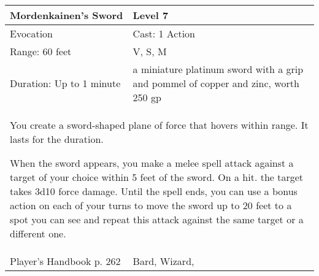 \documentclass[11pt]{report}
\begin{document}
\begin{table}[H]
	\begin{tabular}{||p{6cm}|p{6cm}||}
		\hline\hline
		\bf{Mordenkainen’s Sword} & Level 7\\ \hline
		Evocation & Cast: 1 Action\\ \hline
		Range: 60 feet & V, S, M\\ \hline
		Duration: Up to 1 minute & a miniature platinum sword with a grip and pommel of copper and zinc, worth 250 gp\\ \hline
		\multicolumn{2}{||p{12cm}||}{You create a sword-shaped plane of force that hovers within range. It lasts for the duration.

When the sword appears, you make a melee spell attack against a target of your choice within 5 feet of the sword. On a hit. the target takes 3d10 force damage. Until the spell ends, you can use a bonus action on each of your turns to move the sword up to 20 feet to a spot you can see and repeat this attack against the same target or a different one.}\\ \hline
Player's Handbook p. 262 & Bard, Wizard, \\ \hline\hline
	\end{tabular}
\end{table}
\end{document}

